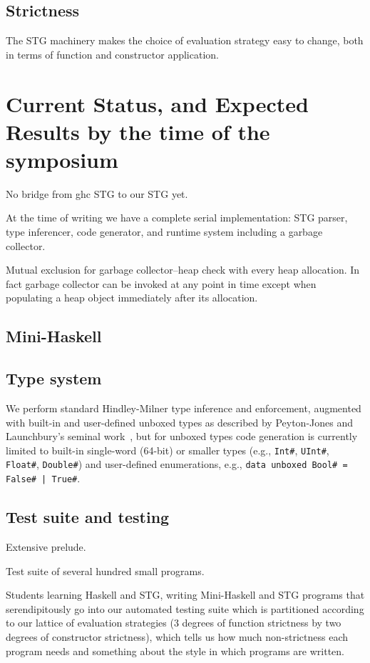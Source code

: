 \documentclass{llncs}
\begin{document}
\subsection{Strictness}

The STG machinery makes the choice of evaluation strategy easy to change, both
in terms of function and constructor application.


\section{Current Status, and Expected Results by the time of the symposium}

No bridge from ghc STG to our STG yet.

At the time of writing we have a complete serial implementation:  STG parser, type inferencer, code
generator, and runtime system including a garbage collector.

Mutual exclusion for garbage collector--heap check with every heap allocation.  In fact garbage collector
can be invoked at any point in time except when populating a heap object immediately after its allocation.

\subsection{Mini-Haskell}

\subsection{Type system}

We perform standard Hindley-Milner type inference and enforcement, augmented
with built-in and user-defined unboxed types as described by Peyton-Jones and
Launchbury's seminal work~\cite{unboxed}, but for unboxed types code
generation is currently limited to built-in single-word (64-bit) or smaller
types (e.g., \texttt{Int\#}, \texttt{UInt\#}, \texttt{Float\#}, \texttt{Double\#})
and user-defined enumerations, e.g., \texttt{data unboxed Bool\# = False\# |
  True\#}.

\subsection{Test suite and testing}

Extensive prelude.

Test suite of several hundred small programs.

Students learning Haskell and STG, writing Mini-Haskell and STG programs that
serendipitously go into our automated testing suite which is partitioned
according to our lattice of evaluation strategies (3 degrees of function
strictness by two degrees of constructor strictness), which tells us how much
non-strictness each program needs and something about the style in which
programs are written.
\end{document}
